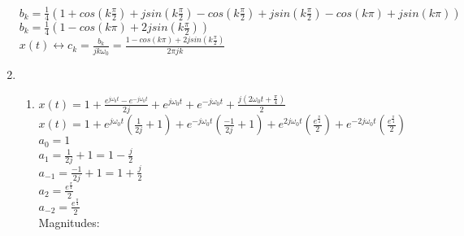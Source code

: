 \documentclass[10pt,a4paper, margin=1in]{article}
\begin{document}
\begin{enumerate}
    $b_k = \frac{1}{4}(1 + cos(k\frac{\pi}{2}) + jsin(k\frac{\pi}{2}) - cos(k\frac{\pi}{2}) + jsin(k\frac{\pi}{2}) - cos(k\pi) + jsin(k\pi))$ \vspace{0.2cm}\\
    $b_k = \frac{1}{4}(1-cos(k\pi) + 2jsin(k\frac{\pi}{2}))$ \vspace{0.2cm}\\
    $x(t) \longleftrightarrow c_k = \frac{b_k}{jk\omega_0} = \frac{1-cos(k\pi) + 2jsin(k\frac{\pi}{2})}{2\pi jk}$ \vspace{0.5cm}\\
\item %
    \begin{enumerate}   
    \item %
        $x(t) = 1 + \frac{e^{j\omega_0t}-e^{-j\omega_0t}}{2j} + e^{j\omega_0t} + e^{-j\omega_0t} + \frac{j(2\omega_0t + \frac{\pi}{4})}{2}$ \vspace{0.2cm}\\
        $x(t) = 1 + e^{j\omega_0t}(\frac{1}{2j}+1) + e^{-j\omega_0t}(\frac{-1}{2j}+1) + e^{2j\omega_0t}(\frac{e^{\frac{\pi}{4}}}{2}) + e^{-2j\omega_0t}(\frac{e^{\frac{\pi}{4}}}{2})$\vspace{0.2cm}\\
        $a_0 = 1$\\
        $a_1 = \frac{1}{2j}+1 = 1-\frac{j}{2}$\\
        $a_{-1}=\frac{-1}{2j}+1 = 1 + \frac{j}{2}$\\
        $a_2=\frac{e^{\frac{\pi}{4}}}{2}$\\
        $a_{-2}=\frac{e^{\frac{\pi}{4}}}{2}$ \vspace{0.2cm}\\
        Magnitudes:\\
        \def\xmin{-2.5} %
        \def\xmax{2.5}     %
        \def\ymin{0.5}    %
        \def\ymax{3.6}     %
\end{enumerate}
\end{enumerate}
\end{document}
